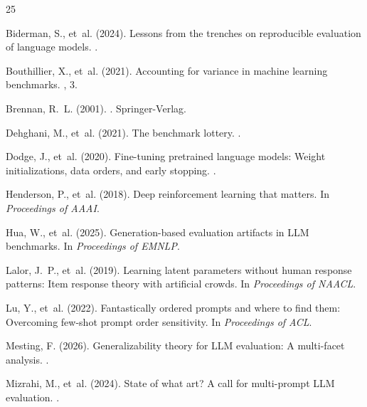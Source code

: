 \documentclass[letterpaper,11pt]{article}
\begin{document}
\begin{thebibliography}{25}

Biderman, S., et~al. (2024).
\newblock Lessons from the trenches on reproducible evaluation of language models.
.

Bouthillier, X., et~al. (2021).
\newblock Accounting for variance in machine learning benchmarks.
, 3.

Brennan, R.~L. (2001).
.
\newblock Springer-Verlag.

Dehghani, M., et~al. (2021).
\newblock The benchmark lottery.
.

Dodge, J., et~al. (2020).
\newblock Fine-tuning pretrained language models: Weight initializations, data orders, and early stopping.
.

Henderson, P., et~al. (2018).
\newblock Deep reinforcement learning that matters.
\newblock In {\em Proceedings of AAAI}.

Hua, W., et~al. (2025).
\newblock Generation-based evaluation artifacts in LLM benchmarks.
\newblock In {\em Proceedings of EMNLP}.

Lalor, J.~P., et~al. (2019).
\newblock Learning latent parameters without human response patterns: Item response theory with artificial crowds.
\newblock In {\em Proceedings of NAACL}.

Lu, Y., et~al. (2022).
\newblock Fantastically ordered prompts and where to find them: Overcoming few-shot prompt order sensitivity.
\newblock In {\em Proceedings of ACL}.

Mesting, F. (2026).
\newblock Generalizability theory for LLM evaluation: A multi-facet analysis.
.

Mizrahi, M., et~al. (2024).
\newblock State of what art? A call for multi-prompt LLM evaluation.
.


\end{thebibliography}
\end{document}
